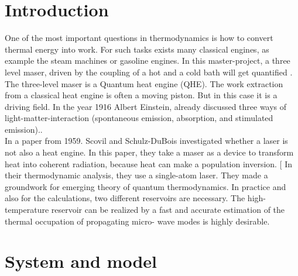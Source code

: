 \documentclass[12pt,a4paper]{article}
\begin{document}
\section{Introduction}
One of the most important questions in thermodynamics is how to convert
thermal energy into work. For such tasks exists many classical engines, as
example the steam machines or gasoline engines. %
In this master-project, a three level maser, driven by the coupling of a hot and a cold bath will get quantified .
The three-level maser is a Quantum heat engine (QHE). The work extraction from a classical heat engine is often a moving piston. But in this case
it is a driving field. In the year 1916 Albert Einstein, already discussed three ways of
light-matter-interaction (spontaneous emission, absorption, and stimulated
emission).\cite{Li2017}. \\In a paper from 1959.  Scovil and Schulz-DuBois investigated whether a laser is not
also a heat engine. In this paper, they take a maser as a device to transform heat into coherent radiation, because heat can make a population inversion. [\cite{Scovil1959}
In their thermodynamic analysis, they use a single-atom laser. They made a
groundwork for emerging theory of quantum thermodynamics. In practice and also for the calculations, two different reservoirs are necessary. The high-temperature reservoir can be
realized by a fast and accurate
estimation of the thermal occupation of propagating micro-
wave modes is highly desirable. \cite{Scigliuzzo2020}

\newpage

\section{System and model}
\end{document}
